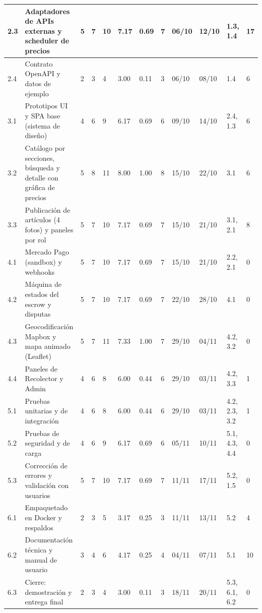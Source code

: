 \documentclass[letterpaper,11pt]{article}
\begin{document}
{\begin{longtable}{|p{0.9cm}|>{\raggedright\arraybackslash}p{4.4cm}|p{0.5cm}|p{0.5cm}|p{0.5cm}|p{0.8cm}|p{0.8cm}|p{0.75cm}|p{1.1cm}|p{1.1cm}|p{1.6cm}|p{0.75cm}|}
2.3 & Adaptadores de APIs externas y scheduler de precios & 5 & 7 & 10 & 7.17 & 0.69 & 7 & 06/10 & 12/10 & 1.3, 1.4 & 17 \\ \hline
2.4 & Contrato OpenAPI y datos de ejemplo & 2 & 3 & 4 & 3.00 & 0.11 & 3 & 06/10 & 08/10 & 1.4 & 6 \\ \hline
3.1 & Prototipos UI y SPA base (sistema de diseño) & 4 & 6 & 9 & 6.17 & 0.69 & 6 & 09/10 & 14/10 & 2.4, 1.3 & 6 \\ \hline
3.2 & Catálogo por secciones, búsqueda y detalle con gráfica de precios & 5 & 8 & 11 & 8.00 & 1.00 & 8 & 15/10 & 22/10 & 3.1 & 6 \\ \hline
3.3 & Publicación de artículos (4 fotos) y paneles por rol & 5 & 7 & 10 & 7.17 & 0.69 & 7 & 15/10 & 21/10 & 3.1, 2.1 & 8 \\ \hline
4.1 & Mercado Pago (sandbox) y webhooks & 5 & 7 & 10 & 7.17 & 0.69 & 7 & 15/10 & 21/10 & 2.2, 2.1 & 0 \\ \hline
4.2 & Máquina de estados del escrow y disputas & 5 & 7 & 10 & 7.17 & 0.69 & 7 & 22/10 & 28/10 & 4.1 & 0 \\ \hline
4.3 & Geocodificación Mapbox y mapa animado (Leaflet) & 5 & 7 & 11 & 7.33 & 1.00 & 7 & 29/10 & 04/11 & 4.2, 3.2 & 0 \\ \hline
4.4 & Paneles de Recolector y Admin & 4 & 6 & 8 & 6.00 & 0.44 & 6 & 29/10 & 03/11 & 4.2, 3.3 & 1 \\ \hline
5.1 & Pruebas unitarias y de integración & 4 & 6 & 8 & 6.00 & 0.44 & 6 & 29/10 & 03/11 & 4.2, 2.3, 3.2 & 1 \\ \hline
5.2 & Pruebas de seguridad y de carga & 4 & 6 & 9 & 6.17 & 0.69 & 6 & 05/11 & 10/11 & 5.1, 4.3, 4.4 & 0 \\ \hline
5.3 & Corrección de errores y validación con usuarios & 5 & 7 & 10 & 7.17 & 0.69 & 7 & 11/11 & 17/11 & 5.2, 1.5 & 0 \\ \hline
6.1 & Empaquetado en Docker y respaldos & 2 & 3 & 5 & 3.17 & 0.25 & 3 & 11/11 & 13/11 & 5.2 & 4 \\ \hline
6.2 & Documentación técnica y manual de usuario & 3 & 4 & 6 & 4.17 & 0.25 & 4 & 04/11 & 07/11 & 5.1 & 10 \\ \hline
6.3 & Cierre: demostración y entrega final & 2 & 3 & 4 & 3.00 & 0.11 & 3 & 18/11 & 20/11 & 5.3, 6.1, 6.2 & 0 \\ \hline
\end{longtable}
}
\end{document}
